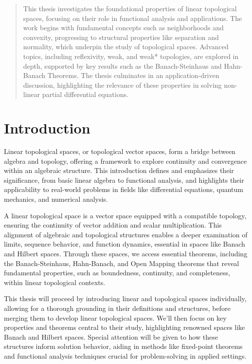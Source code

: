 \documentclass[12pt, reqno]{amsart}
\theoremstyle{definition}
\numberwithin{equation}{section}
\begin{document}
\newpage
\begin{abstract}
This thesis investigates the foundational properties of linear topological spaces, focusing on their role in functional analysis and applications. The work begins with fundamental concepts such as neighborhoods and convexity, progressing to structural properties like separation and normality, which underpin the study of topological spaces. Advanced topics, including reflexivity, weak, and weak* topologies, are explored in depth, supported by key results such as the Banach-Steinhaus and Hahn-Banach Theorems. The thesis culminates in an application-driven discussion, highlighting the relevance of these properties in solving non-linear partial differential equations.
\end{abstract}
\maketitle
\newpage
\tableofcontents
\newpage
\doublespacing

\section{Introduction}
Linear topological spaces, or topological vector spaces, form a bridge between algebra and topology, offering a framework to explore continuity and convergence within an algebraic structure. This introduction defines and emphasizes their significance, from basic linear algebra to functional analysis, and highlights their applicability to real-world problems in fields like differential equations, quantum mechanics, and numerical analysis.

A linear topological space is a vector space equipped with a compatible topology, ensuring the continuity of vector addition and scalar multiplication. This alignment of algebraic and topological structures enables a deeper examination of limits, sequence behavior, and function dynamics, essential in spaces like Banach and Hilbert spaces. Through these spaces, we access essential theorems, including the Banach-Steinhaus, Hahn-Banach, and Open Mapping theorems that reveal fundamental properties, such as boundedness, continuity, and completeness, within linear topological contexts.

This thesis will proceed by introducing linear and topological spaces individually, allowing for a thorough grounding in their definitions and structures, before merging them to develop linear topological spaces. We'll then focus on key properties and theorems central to their study, highlighting renowned spaces like Banach and Hilbert spaces. Special attention will be given to how these structures inform solution behavior, aiding in methods like fixed-point theorems and functional analysis techniques crucial for problem-solving in applied settings.
\end{document}
